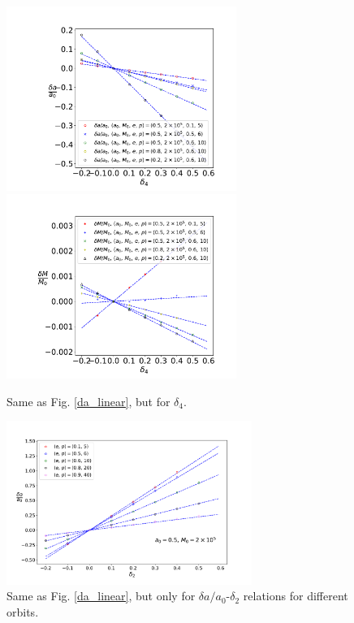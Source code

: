 \documentclass{article}
\begin{document}
\begin{figure}[!ht]
	\centering
	\includegraphics[width=7.5cm]{d4_spin_linear.pdf}
	\includegraphics[width=7.5cm]{d4_M_linear.pdf}
	\caption{Same as Fig. \ref{da_linear}, but for $\delta_4$.}
	\label{d4_linear}
\end{figure}

\begin{figure}[!ht]
	\centering
	\includegraphics[width=8cm]{d2_deltaspin_ep.pdf}
	
	\caption{Same as Fig. \ref{da_linear}, but only for $\delta a/a_0$-$\delta_2$ relations for different orbits.}
	\label{ep_slope}
\end{figure}
\end{document}
